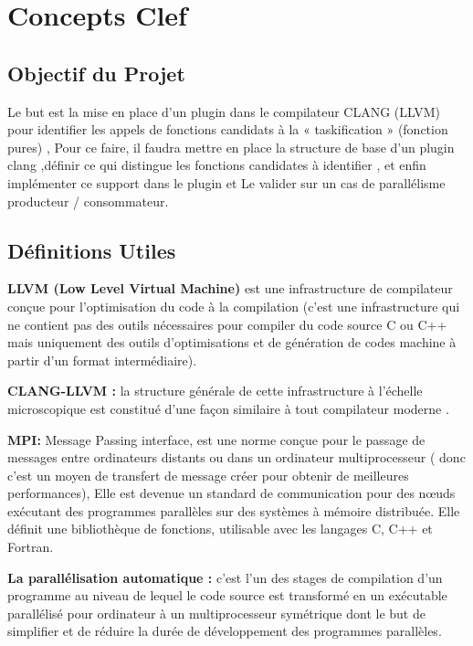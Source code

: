 \documentclass[12pt,titlepage]{article}
\begin{document}
\section{Concepts Clef}

\subsection{Objectif du Projet}

Le but est la mise en place d’un plugin dans le compilateur CLANG (LLVM) pour identifier les appels de fonctions candidats à la « taskification » (fonction pures) , Pour ce faire, il faudra mettre en place la structure de base d’un plugin clang ,définir ce qui distingue les fonctions candidates à identifier , et enfin implémenter ce support dans le plugin et  Le valider sur un cas de parallélisme producteur / consommateur.

\subsection{Définitions Utiles} 
	
\textbf{ LLVM (Low Level Virtual Machine)} est une infrastructure de compilateur conçue pour l'optimisation du code à la compilation (c’est une infrastructure qui ne contient pas des outils nécessaires pour compiler du code source C ou C++ mais uniquement des outils d’optimisations et de génération de codes machine à partir d’un format intermédiaire).\cite{clangllvm}
              
\textbf{CLANG-LLVM :} la structure générale de cette infrastructure à l’échelle microscopique est constitué d’une façon similaire à tout compilateur moderne .\cite{clangllvm}


\textbf{ MPI:} Message Passing interface, est une norme conçue pour le passage de messages entre ordinateurs distants ou dans un ordinateur multiprocesseur ( donc c’est un moyen de transfert de message créer pour obtenir de meilleures performances), Elle est devenue un standard de communication pour des nœuds exécutant des programmes parallèles sur des systèmes à mémoire distribuée. Elle définit une bibliothèque de fonctions, utilisable avec les langages C, C++ et Fortran.\cite{wiki}


\textbf{ La parallélisation automatique :} c’est l’un des stages de compilation d’un programme au niveau de lequel le code source est transformé  en un exécutable parallélisé pour ordinateur à un multiprocesseur symétrique dont le but de simplifier et de réduire la durée de développement des programmes parallèles.\cite{wiki}
\end{document}
